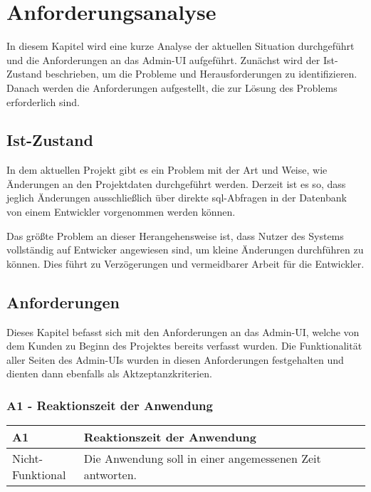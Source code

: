 \newpage
\section{Anforderungsanalyse}
In diesem Kapitel wird eine kurze Analyse der aktuellen Situation durchgeführt und die Anforderungen an das Admin-UI aufgeführt. Zunächst wird der Ist-Zustand beschrieben, um die Probleme und Herausforderungen zu identifizieren.
Danach werden die Anforderungen aufgestellt, die zur Lösung des Problems erforderlich sind.

\subsection[Ist-Zustand]{Ist-Zustand}
In dem aktuellen Projekt gibt es ein Problem mit der Art und Weise, wie Änderungen an den Projektdaten durchgeführt werden.
Derzeit ist es so, dass jeglich Änderungen ausschließlich über direkte \gls{sql}-Abfragen in der Datenbank von einem Entwickler vorgenommen werden können.

Das größte Problem an dieser Herangehensweise ist, dass Nutzer des Systems vollständig auf Entwicker angewiesen sind, um kleine Änderungen durchführen zu können.
Dies führt zu Verzögerungen und vermeidbarer Arbeit für die Entwickler.

\subsection[Anforderungen]{Anforderungen}
Dieses Kapitel befasst sich mit den Anforderungen an das Admin-UI, welche von dem Kunden zu Beginn des Projektes bereits verfasst wurden.
Die Funktionalität aller Seiten des Admin-UIs wurden in diesen Anforderungen festgehalten und dienten dann ebenfalls als Aktzeptanzkriterien.

\subsubsection[A1 - Reaktionszeit der Anwendung]{A1 - Reaktionszeit der Anwendung}

\begin{center}
    \begin{tabular}{ |p{0.2\linewidth}|p{0.8\linewidth}| } 
        \hline
        \rowcolor{lightgray}
        \textbf{A1} & \textbf{Reaktionszeit der Anwendung} \\
        \hline
        Nicht-Funktional &  Die Anwendung soll in einer angemessenen Zeit antworten.\\ 
        \hline
    \end{tabular}
\end{center}

